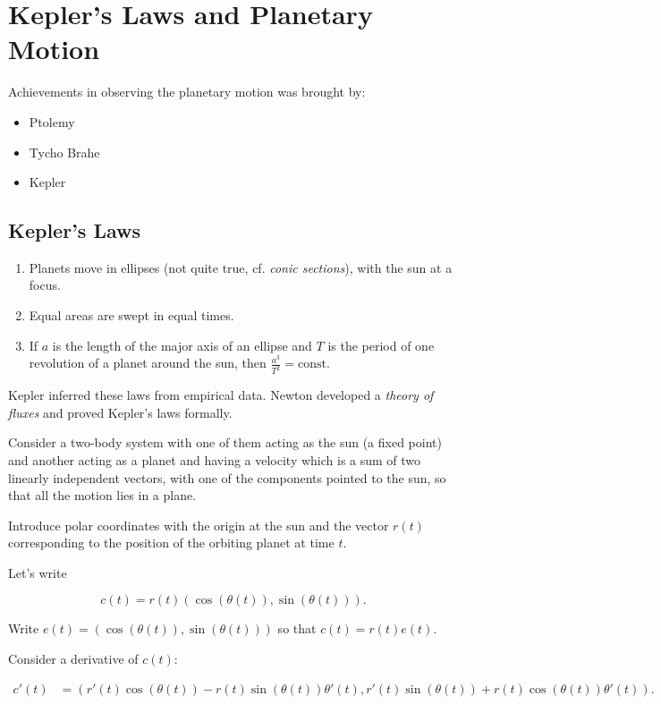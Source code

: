 \documentclass[11pt]{scrartcl}
\begin{document}
\section{Kepler's Laws and Planetary Motion}

Achievements in observing the planetary motion was brought by:
\begin{itemize}
\item Ptolemy
\item Tycho Brahe
\item Kepler
\end{itemize}

\subsection{Kepler's Laws}

\begin{enumerate}
\item\label{item:1} Planets move in ellipses (not quite true,
  cf. \textit{conic sections}), with the sun at a focus.
\item Equal areas are swept in equal times.
\item If $a$ is the length of the major axis of an ellipse and $T$ is
  the period of one revolution of a planet around the sun, then $\frac{a^3}{T^2} = \text{const}$.
\end{enumerate}

Kepler inferred these laws from empirical data. Newton developed a
\textit{theory of fluxes} and proved Kepler's laws formally.

Consider a two-body system with one of them acting as the sun (a fixed
point) and another acting as a planet and having a velocity which is a
sum of two linearly independent vectors, with one of the components
pointed to the sun, so that all the motion lies in a plane.

Introduce polar coordinates with the origin at the sun and the vector
$r(t)$ corresponding to the position of the orbiting planet at time $t$.

Let's write

\begin{equation*}
c(t) = r(t)(\cos(\theta(t)), \sin(\theta(t))).
\end{equation*}

Write $e(t) = (\cos(\theta(t)), \sin(\theta(t)))$ so that
$c(t) = r(t)e(t)$.

Consider a derivative of $c(t)$:

\begin{align}
c'(t) &= (r'(t)\cos(\theta(t))-r(t)\sin(\theta(t))\theta'(t), r'(t)\sin(\theta(t)) + r(t)\cos(\theta(t))\theta'(t)).
\end{align}
\end{document}
